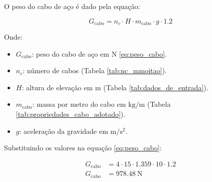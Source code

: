 O peso do cabo de aço é dado pela equação:

\begin{equation}
  G_{\text{cabo}} = n_c \cdot H \cdot m_{\text{cabo}} \cdot g \cdot \num{1.2}
  \label{eq:peso_cabo}
\end{equation}

Onde:

\begin{itemize}[leftmargin=1.25cm]
  \item $G_{\text{cabo}}$: peso do cabo de aço em $\si{\newton}$ \eqref{eq:peso_cabo}.
  \item $n_c$: número de cabos (Tabela \ref{tab:nc_mmoitao}).
  \item $H$: altura de elevação em $\si{\meter}$ (Tabela \ref{tab:dados_de_entrada}).
  \item $m_{\text{cabo}}$: massa por metro do cabo em $\si{\kilo\gram/\meter}$ (Tabela \ref{tab:propriedades_cabo_adotado}).
  \item $g$: aceleração da gravidade em $\si{\meter\per\second\squared}$.
\end{itemize}

\vspace{1em}

Substituindo os valores na equação \eqref{eq:peso_cabo}:

\begin{align*}
  G_{\text{cabo}} & = 4 \cdot 15 \cdot \num{1.359} \cdot 10 \cdot \num{1.2} \\
  G_{\text{cabo}} & = \boxed{\SI{978.48}{\newton}}
\end{align*}
